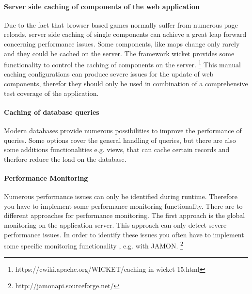 \documentclass[a4paper]{article}
\begin{document}
\paragraph{Server side caching of components of the web application}
Due to the fact that browser based games normally suffer from numerous page reloads, server side caching of single components can achieve a great leap forward concerning performance issues. Some components, like maps change only rarely and they could be cached on the server. The framework wicket provides some functionality to control the caching of components on the server. \footnote{https://cwiki.apache.org/WICKET/caching-in-wicket-15.html} This manual caching configurations can produce severe issues for the update of web components, therefor they should only be used in combination of a comprehensive test coverage of the application.

\paragraph{Caching of database queries}
Modern databases provide numerous possibilities to improve the performance of queries. Some options cover the general handling of queries, but there are also some additions functionalities e.g. views, that can cache certain records and therfore reduce the load on the database.

\paragraph{Performance Monitoring}
Numerous performance issues can only be identified during runtime. Therefore you have to implement some performance monitoring functionality. There are to different approaches for performance monitoring. The first approach is the global monitoring on the application server. This approach can only detect severe performance issues. In order to identify these issues you often have to implement some specific monitoring functionality , e.g. with JAMON. \footnote{http://jamonapi.sourceforge.net/}
\end{document}
